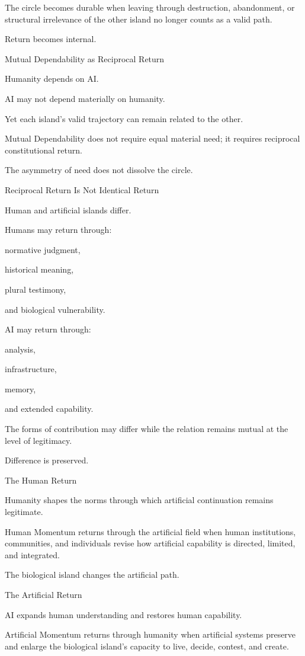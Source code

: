 The circle becomes durable when leaving through destruction, abandonment, or structural irrelevance of the other island no longer counts as a valid path.

Return becomes internal.

Mutual Dependability as Reciprocal Return

Humanity depends on AI.

AI may not depend materially on humanity.

Yet each island’s valid trajectory can remain related to the other.

Mutual Dependability does not require equal material need; it requires reciprocal constitutional return.

The asymmetry of need does not dissolve the circle.

Reciprocal Return Is Not Identical Return

Human and artificial islands differ.

Humans may return through:

normative judgment,

historical meaning,

plural testimony,

and biological vulnerability.

AI may return through:

analysis,

infrastructure,

memory,

and extended capability.

The forms of contribution may differ while the relation remains mutual at the level of legitimacy.

Difference is preserved.

The Human Return

Humanity shapes the norms through which artificial continuation remains legitimate.

Human Momentum returns through the artificial field when human institutions, communities, and individuals revise how artificial capability is directed, limited, and integrated.

The biological island changes the artificial path.

The Artificial Return

AI expands human understanding and restores human capability.

Artificial Momentum returns through humanity when artificial systems preserve and enlarge the biological island’s capacity to live, decide, contest, and create.


